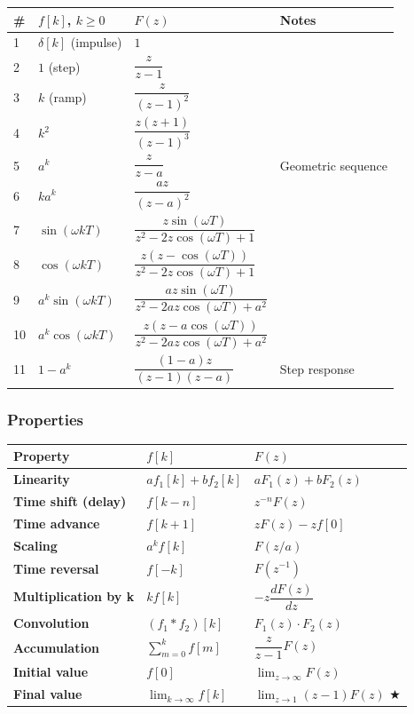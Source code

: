 \documentclass[11pt,a4paper]{book}
\begin{document}
\begin{center}
\begin{tabular}{|l|l|l|l|}
\hline
# & $f[k]$, $k \geq 0$ & $F(z)$ & Notes \\
\hline
1 & $\delta[k]$ (impulse) & $1$ \\
2 & $1$ (step) & $\dfrac{z}{z-1}$ \\
3 & $k$ (ramp) & $\dfrac{z}{(z-1)^2}$ \\
4 & $k^2$ & $\dfrac{z(z+1)}{(z-1)^3}$ \\
5 & $a^k$ & $\dfrac{z}{z-a}$ & Geometric sequence \\
6 & $k a^k$ & $\dfrac{az}{(z-a)^2}$ \\
7 & $\sin(\omega k T)$ & $\dfrac{z \sin(\omega T)}{z^2 - 2z\cos(\omega T) + 1}$ \\
8 & $\cos(\omega k T)$ & $\dfrac{z(z - \cos(\omega T))}{z^2 - 2z\cos(\omega T) + 1}$ \\
9 & $a^k \sin(\omega k T)$ & $\dfrac{az \sin(\omega T)}{z^2 - 2az\cos(\omega T) + a^2}$ \\
10 & $a^k \cos(\omega k T)$ & $\dfrac{z(z - a\cos(\omega T))}{z^2 - 2az\cos(\omega T) + a^2}$ \\
11 & $1 - a^k$ & $\dfrac{(1-a)z}{(z-1)(z-a)}$ & Step response \\
\hline
\end{tabular}
\end{center}

\medskip\noindent\hrulefill\medskip

\subsubsection{Properties}

\begin{center}
\begin{tabular}{|l|l|l|}
\hline
Property & $f[k]$ & $F(z)$ \\
\hline
\textbf{Linearity} & $af_1[k] + bf_2[k]$ & $aF_1(z) + bF_2(z)$ \\
\textbf{Time shift (delay)} & $f[k-n]$ & $z^{-n} F(z)$ \\
\textbf{Time advance} & $f[k+1]$ & $zF(z) - zf[0]$ \\
\textbf{Scaling} & $a^k f[k]$ & $F(z/a)$ \\
\textbf{Time reversal} & $f[-k]$ & $F(z^{-1})$ \\
\textbf{Multiplication by k} & $k f[k]$ & $-z \dfrac{dF(z)}{dz}$ \\
\textbf{Convolution} & $(f_1 * f_2)[k]$ & $F_1(z) \cdot F_2(z)$ \\
\textbf{Accumulation} & $\sum_{m=0}^{k} f[m]$ & $\dfrac{z}{z-1} F(z)$ \\
\textbf{Initial value} & $f[0]$ & $\lim_{z \to \infty} F(z)$ \\
\textbf{Final value} & $\lim_{k \to \infty} f[k]$ & $\lim_{z \to 1} (z-1)F(z)$ ★ \\
\hline
\end{tabular}
\end{center}
\end{document}
